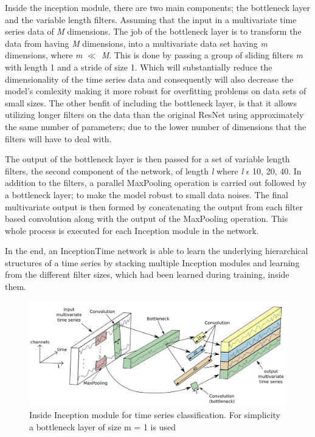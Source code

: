 Inside the inception module, there are two main components; the bottleneck layer and the variable length filters.
Assuming that the input in a multivariate time series data of \emph{M} dimensions. The job of the bottleneck layer is to transform
the data from having \emph{M} dimensions, into a multivariate data set having \emph{m} dimensions, where \emph{m} $\ll$ \emph{M}.
This is done by passing a group of sliding filters \emph{m} with length 1 and a stride of size 1.
Which will substantially reduce the dimensionality of the time series data and consequently will also decrease the model's comlexity
making it more robust for overfitting problems on data sets of small sizes. The other benfit of including the bottleneck layer,
is that it allows utilizing longer filters on the data than the original ResNet using approximately the same number of parameters;
due to the lower number of dimensions that the filters will have to deal with.

The output of the bottleneck layer is then passed for a set of variable length filters, the second component of the network, of length \emph{l}
where \emph{l} $\epsilon$ {10, 20, 40}. In addition to the filters, a parallel MaxPooling operation is carried out followed by a bottleneck layer;
to make the model robust to small data noises. The final multivariate output is then formed by concatenating the output from each filter based convolution
along with the output of the MaxPooling operation. This whole process is executed for each Inception module in the network.

In the end, an InceptionTime network is able to learn the underlying hierarchical structures of a time series by stacking multiple Inception modules
and learning from the different filter sizes, which had been learned during training, inside them.

\begin{figure}[!htbp]
    \captionsetup{justification=raggedright}
    \centering
    \includegraphics[scale = 0.5]{InceptionTime.JPG}
    \centering
    \caption{Inside Inception module for time series classification. For simplicity a bottleneck layer of size m = 1 is used \cite{fawaz2020inceptiontime}}
    \label{Img:InceptionTime}
\end{figure}

